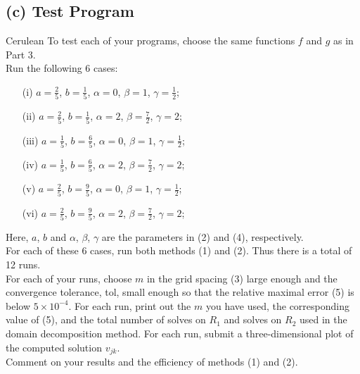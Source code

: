 \documentclass[12pt]{article}
\begin{document}
\subsection{(c) Test Program}\begin{mybox}{Cerulean}{}
To test each of your programs, choose the same functions $f$ and $g$ as in Part 3.\\
Run the following 6 cases:
\begin{itemize}
\item[(i)] $a = \frac{2}{5}$, $b = \frac{1}{5}$, $\alpha = 0$, $\beta = 1$, $\gamma = \frac{1}{2}$;
\item[(ii)] $a = \frac{2}{5}$, $b = \frac{1}{5}$, $\alpha = 2$, $\beta = \frac{7}{2}$, $\gamma = 2$;
\item[(iii)] $a = \frac{1}{5}$, $b = \frac{6}{5}$, $\alpha = 0$, $\beta = 1$, $\gamma = \frac{1}{2}$;
\item[(iv)] $a = \frac{1}{5}$, $b = \frac{6}{5}$, $\alpha = 2$, $\beta = \frac{7}{2}$, $\gamma = 2$;
\item[(v)] $a = \frac{2}{5}$, $b = \frac{9}{5}$, $\alpha = 0$, $\beta = 1$, $\gamma = \frac{1}{2}$;
\item[(vi)] $a = \frac{2}{5}$, $b = \frac{9}{5}$, $\alpha = 2$, $\beta = \frac{7}{2}$, $\gamma = 2$;
\end{itemize}
Here, $a$, $b$ and $\alpha$, $\beta$, $\gamma$ are the parameters in (2) and (4), respectively.\\
For each of these 6 cases, run both methods (1) and (2).  Thus there is a total of 12 runs.\\
For each of your runs, choose $m$ in the grid spacing (3) large enough and the convergence tolerance, tol, small enough so that the relative maximal error (5) is below $5\times 10^{-4}$.  For each run, print out the $m$ you have used, the corresponding value of (5), and the total number of solves on $R_1$ and solves on $R_2$ used in the domain decomposition method.  For each run, submit a three-dimensional plot of the computed solution $v_{jk}$.\\
Comment on your results and the efficiency of methods (1) and (2).\\
\end{mybox}\text{ }\\
\end{document}
